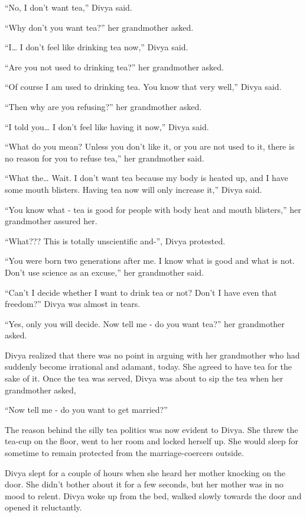 “No, I don't want tea,” Divya said.

“Why don't you want tea?” her grandmother asked.

“I… I don't feel like drinking tea now,” Divya said.

“Are you not used to drinking tea?” her grandmother asked.

“Of course I am used to drinking tea. You know that very well,” Divya said.

“Then why are you refusing?” her grandmother asked.

“I told you… I don't feel like having it now,” Divya said.

“What do you mean? Unless you don't like it, or you are not used to it, there is
no reason for you to refuse tea,” her grandmother said.

“What the… Wait. I don't want tea because my body is heated up, and I have
some mouth blisters. Having tea now will only increase it,” Divya said.

“You know what - tea is good for people with body heat and mouth blisters,” her
grandmother assured her.

“What??? This is totally unscientific and-”, Divya protested.

“You were born two generations after me. I know what is good and what is not.
Don't use science as an excuse,” her grandmother said.

“Can't I decide whether I want to drink tea or not? Don't I have even that
freedom?” Divya was almost in tears.

“Yes, only you will decide. Now tell me - do you want tea?” her grandmother
asked.

Divya realized that there was no point in arguing with her grandmother who had
suddenly become irrational and adamant, today. She agreed to have tea for the
sake of it. Once the tea was served, Divya was about to sip the tea when her
grandmother asked,

“Now tell me - do you want to get married?”

The reason behind the silly tea politics was now evident to Divya. She threw the
tea-cup on the floor, went to her room and locked herself up. She would sleep
for sometime to remain protected from the marriage-coercers outside.

Divya slept for a couple of hours when she heard her mother knocking on the
door. She didn't bother about it for a few seconds, but her mother was in no mood
to relent. Divya woke up from the bed, walked slowly towards the door and opened
it reluctantly.


